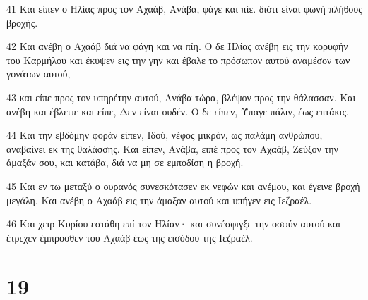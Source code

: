 \par 41 Και είπεν ο Ηλίας προς τον Αχαάβ, Ανάβα, φάγε και πίε. διότι είναι φωνή πλήθους βροχής.
\par 42 Και ανέβη ο Αχαάβ διά να φάγη και να πίη. Ο δε Ηλίας ανέβη εις την κορυφήν του Καρμήλου και έκυψεν εις την γην και έβαλε το πρόσωπον αυτού αναμέσον των γονάτων αυτού,
\par 43 και είπε προς τον υπηρέτην αυτού, Ανάβα τώρα, βλέψον προς την θάλασσαν. Και ανέβη και έβλεψε και είπε, Δεν είναι ουδέν. Ο δε είπεν, Ύπαγε πάλιν, έως επτάκις.
\par 44 Και την εβδόμην φοράν είπεν, Ιδού, νέφος μικρόν, ως παλάμη ανθρώπου, αναβαίνει εκ της θαλάσσης. Και είπεν, Ανάβα, ειπέ προς τον Αχαάβ, Ζεύξον την άμαξάν σου, και κατάβα, διά να μη σε εμποδίση η βροχή.
\par 45 Και εν τω μεταξύ ο ουρανός συνεσκότασεν εκ νεφών και ανέμου, και έγεινε βροχή μεγάλη. Και ανέβη ο Αχαάβ εις την άμαξαν αυτού και υπήγεν εις Ιεζραέλ.
\par 46 Και χειρ Κυρίου εστάθη επί τον Ηλίαν· και συνέσφιγξε την οσφύν αυτού και έτρεχεν έμπροσθεν του Αχαάβ έως της εισόδου της Ιεζραέλ.

\chapter{19}

